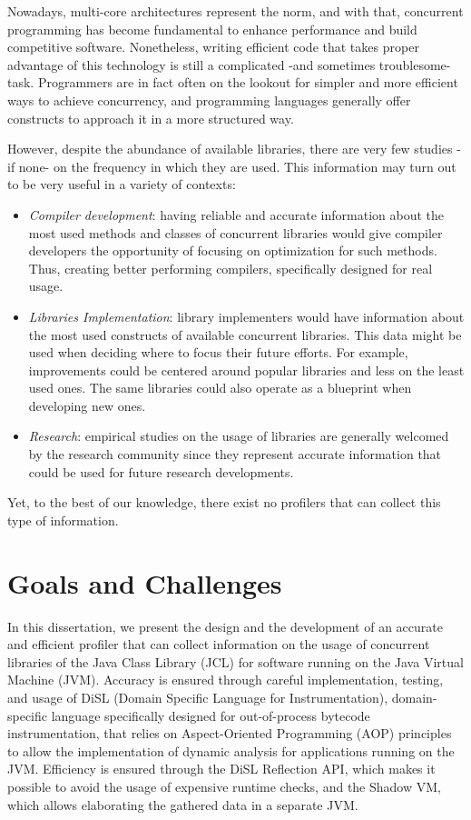 \documentclass[]{usiinfthesis}
\begin{document}
Nowadays, multi-core architectures represent the norm, and with that, concurrent programming has become fundamental to enhance performance and build competitive software. Nonetheless, writing efficient code that takes proper advantage of this technology is still a complicated -and sometimes troublesome- task. Programmers are in fact often on the lookout for simpler and more efficient ways to achieve concurrency, and programming languages generally offer constructs to approach it in a more structured way. 

However, despite the abundance of available libraries, there are very few studies -if none- on the frequency in which they are used. This information may turn out to be very useful in a variety of contexts:

\begin{itemize}
    \item \textit{Compiler development}: having reliable and accurate information about the most used methods and classes of concurrent libraries would give compiler developers the opportunity of focusing on optimization for such methods. Thus, creating better performing compilers, specifically designed for real usage.
    \item \textit{Libraries Implementation}: library implementers would have information about the most used constructs of available concurrent libraries. This data might be used when deciding where to focus their future efforts. For example, improvements could be centered around popular libraries and less on the least used ones. The same libraries could also operate as a blueprint when developing new ones.
    \item \textit{Research}: empirical studies on the usage of libraries are generally welcomed by the research community since they represent accurate information that could be used for future research developments.
\end{itemize}
Yet, to the best of our knowledge, there exist no profilers that can collect this type of information. 

\section{Goals and Challenges}
In this dissertation, we present the design and the development of an accurate and efficient profiler that can collect information on the usage of concurrent libraries of the Java Class Library (JCL) for software running on the Java Virtual Machine (JVM). Accuracy is ensured through careful implementation, testing, and usage of DiSL (Domain Specific Language for Instrumentation), domain-specific language specifically designed for out-of-process bytecode instrumentation, that relies on Aspect-Oriented Programming (AOP) principles to allow the implementation of dynamic analysis for applications running on the JVM. Efficiency is ensured through the DiSL Reflection API, which makes it possible to avoid the usage of expensive runtime checks, and the Shadow VM, which allows elaborating the gathered data in a separate JVM. 
\end{document}
